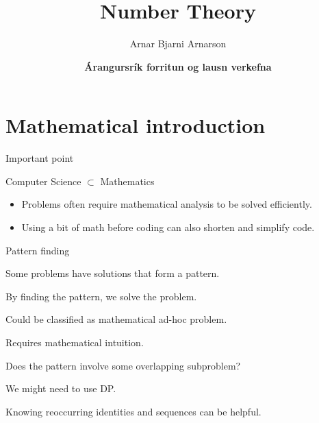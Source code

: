\documentclass{beamer}
\title{Number Theory}
\author{Arnar Bjarni Arnarson}
\institute{\href{http://ru.is/td}{School of Computer Science} \\[2pt] \href{http://ru.is}{Reykjavík University}}
\date{\textbf{Árangursrík forritun og lausn verkefna}}
\begin{document}
\begin{frame}[plain]
    \titlepage
\end{frame}

\section*{Mathematical introduction}

\begin{frame}[plain]{Important point}
    \begin{center}
        Computer Science $\subset$ Mathematics
    \end{center}
    \vspace{10pt}
    \begin{itemize}
        \item Problems often require mathematical analysis to be solved efficiently.
        \item Using a bit of math before coding can also shorten and simplify code.
    \end{itemize}
\end{frame}

\begin{frame}[plain]{Pattern finding}
    \vspace{20pt}
    \begin{itemize}
        \item Some problems have solutions that form a pattern.
         \item By finding the pattern, we solve the problem.
        \item Could be classified as mathematical ad-hoc problem.
        \item Requires mathematical intuition.
          {
            \item Does the pattern involve some overlapping subproblem? \\
        }  {
            We might need to use {\color{blue}DP}.
        }  {
            \item Knowing reoccurring identities and sequences can be helpful.
        }
    \end{itemize}
\end{frame}
\end{document}
